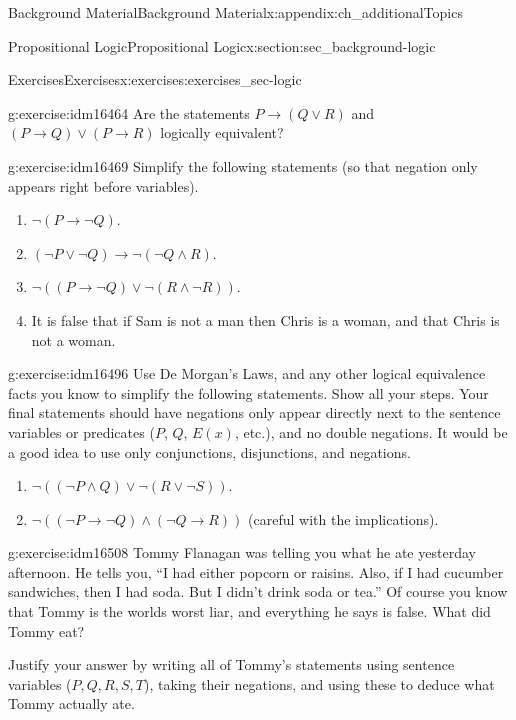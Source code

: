 \documentclass[oneside,10pt,]{book}
\numberwithin{equation}{chapter}
\def\imp{\rightarrow}
\begin{document}
\begin{appendixptx}{Background Material}{}{Background Material}{}{}{x:appendix:ch_additionalTopics}
\begin{sectionptx}{Propositional Logic}{}{Propositional Logic}{}{}{x:section:sec_background-logic}
\begin{exercises-subsection}{Exercises}{}{Exercises}{}{}{x:exercises:exercises_sec-logic}
\begin{divisionexercise}{6}{}{}{g:exercise:idm16464}
Are the statements \(P \imp (Q\vee R)\) and \((P \imp Q) \vee (P \imp R)\) logically equivalent?%
\end{divisionexercise}%
\begin{divisionexercise}{7}{}{}{g:exercise:idm16469}%
Simplify the following statements (so that negation only appears right before variables).%
\par
%
\begin{enumerate}[label=(\alph*)]
\item{}\(\neg(P \imp \neg Q)\).%
\item{}\((\neg P \vee \neg Q) \imp \neg (\neg Q \wedge R)\).%
\item{}\(\neg((P \imp \neg Q) \vee \neg (R \wedge \neg R))\).%
\item{}It is false that if Sam is not a man then Chris is a woman, and that Chris is not a woman.%
\end{enumerate}
%
\end{divisionexercise}%
\begin{divisionexercise}{8}{}{}{g:exercise:idm16496}%
Use De Morgan's Laws, and any other logical equivalence facts you know to simplify the following statements. Show all your steps. Your final statements should have negations only appear directly next to the sentence variables or predicates (\(P\), \(Q\), \(E(x)\), etc.), and no double negations. It would be a good idea to use only conjunctions, disjunctions, and negations.%
\par
%
\begin{enumerate}[label=(\alph*)]
\item{}\(\neg((\neg P \wedge Q) \vee \neg(R \vee \neg S))\). %
\item{}\(\neg((\neg P \imp \neg Q) \wedge (\neg Q \imp R))\) (careful with the implications). %
\end{enumerate}
%
\end{divisionexercise}%
\begin{divisionexercise}{9}{}{}{g:exercise:idm16508}%
Tommy Flanagan was telling you what he ate yesterday afternoon. He tells you, ``I had either popcorn or raisins. Also, if I had cucumber sandwiches, then I had soda. But I didn't drink soda or tea.'' Of course you know that Tommy is the worlds worst liar, and everything he says is false. What did Tommy eat?%
\par
Justify your answer by writing all of Tommy's statements using sentence variables (\(P, Q, R, S, T\)), taking their negations, and using these to deduce what Tommy actually ate.%
\end{divisionexercise}%

\end{exercises-subsection}
\end{sectionptx}
\end{appendixptx}
\end{document}
